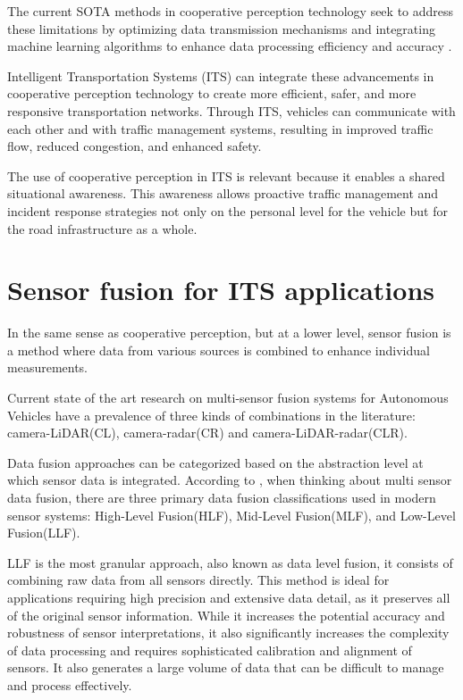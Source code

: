 The current SOTA methods in cooperative perception technology seek to address these limitations by optimizing data transmission mechanisms\cite{THANDAVARAYAN2023103655} and integrating machine learning algorithms to enhance data processing efficiency and accuracy \cite{xu2022v2xvit}.

Intelligent Transportation Systems (ITS) can integrate these advancements in cooperative perception technology to create more efficient, safer, and more responsive transportation networks. Through ITS, vehicles can communicate with each other and with traffic management systems, resulting in improved traffic flow, reduced congestion, and enhanced safety.

The use of cooperative perception in ITS is relevant because it enables a shared situational awareness. This awareness allows proactive traffic management and incident response strategies not only on the personal level for the vehicle but for the road infrastructure as a whole.

\section{Sensor fusion for ITS applications}\label{sensor-fusion-its}

In the same sense as cooperative perception, but at a lower level, sensor fusion is a method where data from various sources is combined to enhance individual measurements.

Current state of the art research on multi-sensor fusion systems for Autonomous Vehicles have a prevalence of three kinds of combinations in the literature: camera-LiDAR(CL), camera-radar(CR) and camera-LiDAR-radar(CLR).

Data fusion approaches can be categorized based on the abstraction level at which sensor data is integrated. According to \cite{s21062140}, when thinking about multi sensor data fusion, there are three primary data fusion classifications used in modern sensor systems: High-Level Fusion(HLF), Mid-Level Fusion(MLF), and Low-Level Fusion(LLF).

LLF is the most granular approach, also known as data level fusion, it consists of combining raw data from all sensors directly. This method is ideal for applications requiring high precision and extensive data detail, as it preserves all of the original sensor information. While it increases the potential accuracy and robustness of sensor interpretations, it also significantly increases the complexity of data processing and requires sophisticated calibration and alignment of sensors. It also generates a large volume of data that can be difficult to manage and process effectively.

